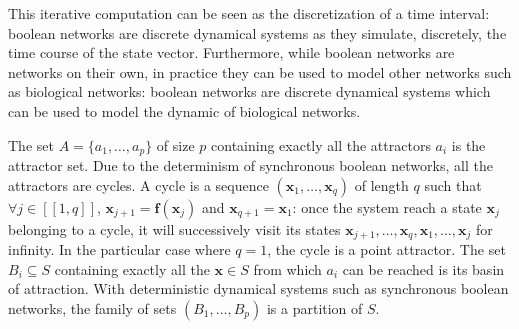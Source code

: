 \documentclass[oneside,a4paper,onecolumn,notitlepage,final]{article}
\begin{document}
This iterative computation can be seen as the discretization of a time interval: boolean networks are discrete dynamical systems as they simulate, discretely, the time course of the state vector. Furthermore, while boolean networks are networks on their own, in practice they can be used to model other networks such as biological networks: boolean networks are discrete dynamical systems which can be used to model the dynamic of biological networks.

The set $A=\lbrace a_1,\dots,a_p\rbrace$ of size $p$ containing exactly all the attractors $a_i$ is the attractor set. Due to the determinism of synchronous boolean networks, all the attractors are cycles. A cycle is a sequence $(\boldsymbol{x}_{1},\dots,\boldsymbol{x}_{q})$ of length $q$ such that $\forall j\in [\![1,q]\!]$, $\boldsymbol{x}_{j+1}=\boldsymbol{f}(\boldsymbol{x}_{j})$ and $\boldsymbol{x}_{q+1}=\boldsymbol{x}_{1}$: once the system reach a state $\boldsymbol{x}_{j}$ belonging to a cycle, it will successively visit its states $\boldsymbol{x}_{j+1},\dots,\boldsymbol{x}_{q},\boldsymbol{x}_{1},\dots,\boldsymbol{x}_{j}$ for infinity. In the particular case where $q=1$, the cycle is a point attractor. The set $B_i\subseteq S$ containing exactly all the $\boldsymbol{x}\in S$ from which $a_i$ can be reached is its basin of attraction. With deterministic dynamical systems such as synchronous boolean networks, the family of sets $(B_1,\dots,B_p)$ is a partition of $S$.
\end{document}

